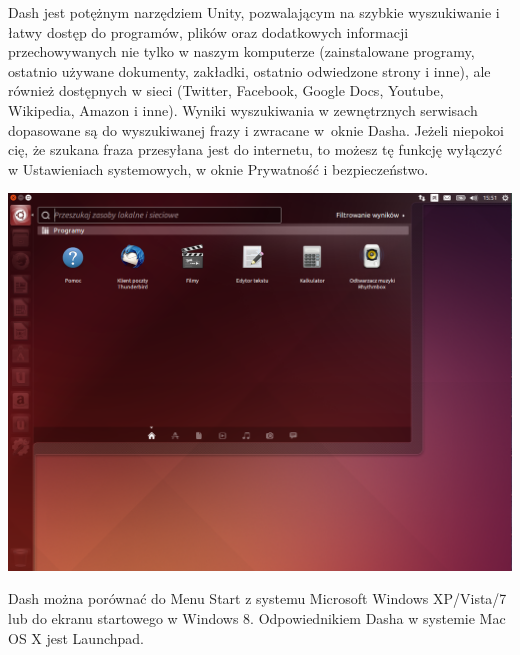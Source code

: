 Dash jest potężnym narzędziem Unity, pozwalającym na szybkie wyszukiwanie i łatwy dostęp do programów, plików oraz dodatkowych informacji przechowywanych nie tylko w naszym komputerze (zainstalowane programy, ostatnio używane dokumenty, zakładki, ostatnio odwiedzone strony i inne), ale również dostępnych w sieci (Twitter, Facebook, Google Docs, Youtube, Wikipedia, Amazon i inne). Wyniki wyszukiwania w zewnętrznych serwisach dopasowane są do wyszukiwanej frazy i zwracane w~oknie Dasha. Jeżeli niepokoi cię, że szukana fraza przesyłana jest do internetu, to możesz tę funkcję wyłączyć w Ustawieniach systemowych, w oknie \textcolor{ubuntu_orange}{Prywatność i bezpieczeństwo}.

\begin{center}
	\includegraphics[width=\linewidth]{images/unity_pulpit_dash.png}
\end{center}

Dash można porównać do Menu Start z systemu Microsoft Windows XP/Vista/7 lub do ekranu startowego w Windows 8. Odpowiednikiem Dasha w systemie Mac OS X jest Launchpad.

